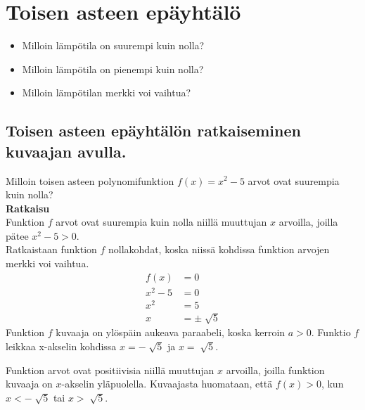 \chapter{Toisen asteen epäyhtälö}
\begin{esimerkki}
\begin{itemize}
\item{Milloin lämpötila on suurempi kuin nolla?}
\item{Milloin lämpötila on pienempi kuin nolla?}
\item{Milloin lämpötilan merkki voi vaihtua?} 
\end{itemize}
\end{esimerkki}
\section{Toisen asteen epäyhtälön ratkaiseminen kuvaajan avulla.}
\begin{esimerkki}
Milloin toisen asteen polynomifunktion $f(x)=x^2-5$ arvot ovat suurempia kuin nolla?  \\
\textbf{Ratkaisu} \\
Funktion $f$ arvot ovat suurempia kuin nolla niillä muuttujan $x$ arvoilla, joilla pätee $x^2-5>0$. \\
Ratkaistaan funktion $f$ nollakohdat, koska niissä kohdissa funktion arvojen merkki voi vaihtua.
\begin{align*}
f(x)&=0 \\
x^2-5&=0 \\
x^2&=5 \\
x&=\pm \sqrt[]{5}
\end{align*}
Funktion $f$ kuvaaja on ylöspäin aukeava paraabeli, koska kerroin $a>0$.
Funktio $f$ leikkaa x-akselin kohdissa $x=-\sqrt[]{5}$ ja $x=\sqrt[]{5}$.

\begin{lukusuora}{-2.5}{2.5}{5}
\end{lukusuora}

Funktion arvot ovat positiivisia niillä muuttujan $x$ arvoilla, joilla funktion kuvaaja on $x$-akselin yläpuolella.
Kuvaajasta huomataan, että $f(x)>0$, kun $x<-\sqrt[]{5}$ tai $x>\sqrt[]{5}$. 
\end{esimerkki}
